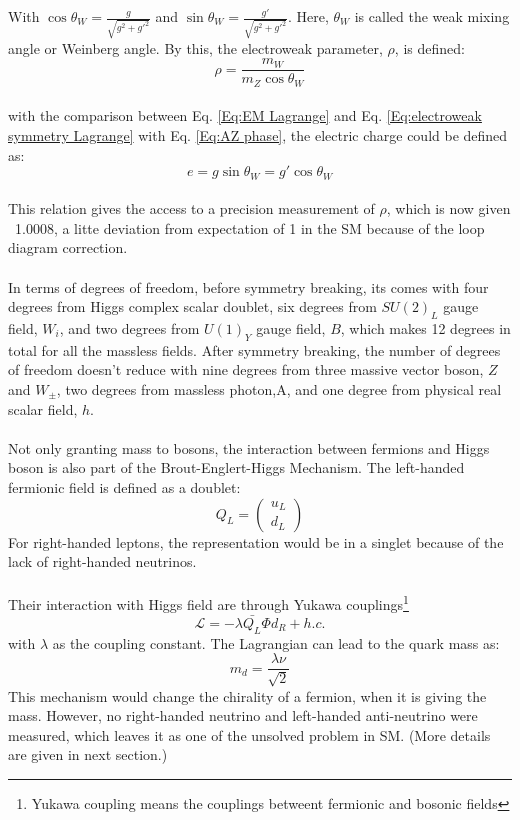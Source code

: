 With $\cos{\theta_W}=\frac{g}{\sqrt{g^2+g'^2}}$ and $\sin{\theta_W}=\frac{g'}{\sqrt{g^2+g'^2}}$. Here, $\theta_W$ is called the weak mixing angle or Weinberg angle. By this, the electroweak parameter, $\rho$, is defined:
\begin{equation}
\label{Eq:rho}
\rho = \frac{m_W}{m_Z\cos{\theta_W}} 
\end{equation}
\\with the comparison between Eq. \ref{Eq:EM Lagrange} and Eq. \ref{Eq:electroweak symmetry Lagrange} with Eq. \ref{Eq:AZ phase}, the electric charge could be defined as:
\begin{equation}
e=g\sin{\theta_W}=g'\cos{\theta_W}
\end{equation}
\\This relation gives the access to a precision measurement of $\rho$, which is now given ~1.0008, a litte deviation from expectation of 1 in the SM because of the loop diagram correction.
\\
\\In terms of degrees of freedom, before symmetry breaking, its comes with four degrees from Higgs complex scalar doublet, six degrees from $SU(2)_L$ gauge field, $W_i$, and two degrees from $U(1)_Y$ gauge field, $B$, which makes 12 degrees in total for all the massless fields. After symmetry breaking, the number of degrees of freedom doesn't reduce with nine degrees from three massive vector boson, $Z$ and $W_{\pm}$, two degrees from massless photon,A, and one degree from physical real scalar field, $h$.
\\
\\Not only granting mass to bosons, the interaction between fermions and Higgs boson is also part of the Brout-Englert-Higgs Mechanism. The left-handed fermionic field is defined as a doublet:
\begin{equation}
 Q_L=\left(  \begin{array}{ c } u_L\\  d_L \end{array} \right)
\end{equation}
For right-handed leptons, the representation would be in a singlet because of the lack of right-handed neutrinos.      
\\
\\Their interaction with Higgs field are through Yukawa couplings\footnote{Yukawa coupling means the couplings betweent fermionic and bosonic fields}
\begin{equation}
\mathcal{L} = -\lambda\bar{Q_L}\Phi d_R + h.c. 
\end{equation}
with $\lambda$ as the coupling constant. The Lagrangian can lead to the quark mass as:
\begin{equation}
 m_d=\frac{\lambda \nu}{\sqrt{2}}
\end{equation}
This mechanism would change the chirality of a fermion, when it is giving the mass. However, no right-handed neutrino and left-handed anti-neutrino were measured, which leaves it as one of the unsolved problem in SM. (More details are given in next section.)
